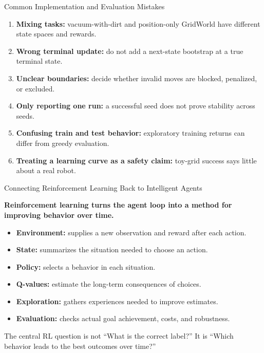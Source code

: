 \documentclass[aspectratio=169,10pt]{beamer}
\newcommand{\conceptlead}[1]{{\small\bfseries\color{CalPolyGreen}#1\par}}
\begin{document}
\begin{frame}{Common Implementation and Evaluation Mistakes}
\small
\begin{enumerate}
\item \textbf{Mixing tasks:} vacuum-with-dirt and position-only GridWorld have different state spaces and rewards.
\item \textbf{Wrong terminal update:} do not add a next-state bootstrap at a true terminal state.
\item \textbf{Unclear boundaries:} decide whether invalid moves are blocked, penalized, or excluded.
\item \textbf{Only reporting one run:} a successful seed does not prove stability across seeds.
\item \textbf{Confusing train and test behavior:} exploratory training returns can differ from greedy evaluation.
\item \textbf{Treating a learning curve as a safety claim:} toy-grid success says little about a real robot.
\end{enumerate}
\end{frame}

\begin{frame}{Connecting Reinforcement Learning Back to Intelligent Agents}
\small
\conceptlead{Reinforcement learning turns the agent loop into a method for improving behavior over time.}
\begin{itemize}
\item \textbf{Environment:} supplies a new observation and reward after each action.
\item \textbf{State:} summarizes the situation needed to choose an action.
\item \textbf{Policy:} selects a behavior in each situation.
\item \textbf{Q-values:} estimate the long-term consequences of choices.
\item \textbf{Exploration:} gathers experiences needed to improve estimates.
\item \textbf{Evaluation:} checks actual goal achievement, costs, and robustness.
\end{itemize}
\begin{keyidea}The central RL question is not ``What is the correct label?'' It is ``Which behavior leads to the best outcomes over time?''\end{keyidea}
\end{frame}
\end{document}
